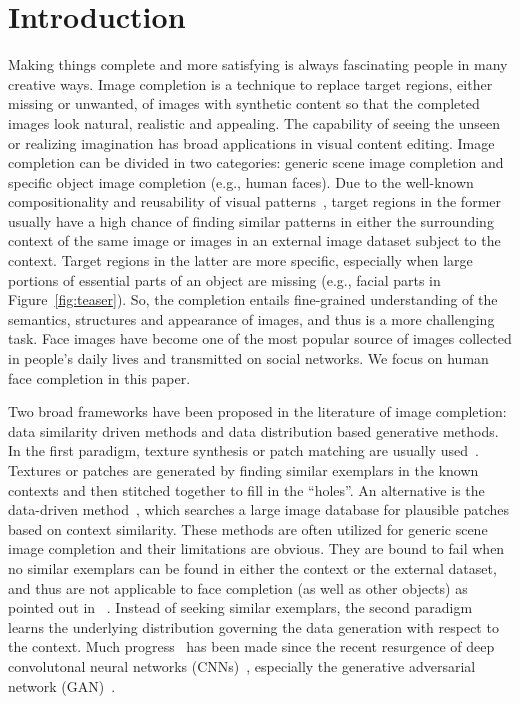 \documentclass[acmtog,timestamp]{acmart}
\begin{document}

\section{Introduction}
Making things complete and more satisfying is always fascinating people in many creative ways. Image completion is a technique to replace target regions, either missing or unwanted, of images with synthetic content so that the completed images look natural, realistic and  appealing. The capability of seeing the unseen or realizing imagination has broad applications in visual content editing. 
Image completion can be divided in two categories: generic scene image completion and specific object image completion (e.g., human faces). Due to the well-known compositionality and reusability of visual patterns~\cite{geman2002composition}, target regions in the former usually have a high chance of finding similar patterns in either the surrounding context of the same image or images in an external image dataset subject to the context. Target regions in the latter are more specific, especially when large portions of essential
parts of an object are missing (e.g., facial parts in Figure~\ref{fig:teaser}). So, the completion entails  fine-grained understanding of the semantics, structures and appearance of images, and thus is a more challenging task. Face images have become one of the most popular source of images collected in people's daily lives and transmitted on social networks. We focus on human face completion in this paper.  

Two broad frameworks have been proposed in the literature of image completion: data similarity driven methods and data distribution based generative methods. In the first paradigm, texture synthesis or patch matching are usually used~\cite{efros1999texture,kwatra2003graphcut,criminisi2003object,wilczkowiak2005hole,komodakis2006image,barnes2009patchmatch,darabi2012image,huang2014image,wexler2007space}. Textures or patches are generated by finding similar exemplars in the known contexts and then stitched together to fill in the ``holes''. An alternative is the data-driven method~\cite{hays2007scene}, which searches a large image database for plausible patches based on context similarity. These methods are often utilized for generic scene image completion and their limitations are obvious. They are bound to fail when no similar exemplars can be found in either the context or the external dataset, and thus are not applicable to face completion (as well as other objects) as pointed out in ~\cite{iizuka2017globally,yeh2017semantic}. Instead of seeking similar exemplars, the second paradigm learns the underlying distribution governing the data generation with respect to the context. Much progress~\cite{li2017generative,yeh2017semantic,yang2016high,iizuka2017globally,denton2016semi,pathak2016context} has been made since the recent resurgence of deep convolutonal neural networks (CNNs)~\cite{cnn,AlexNet}, especially the generative adversarial network (GAN)~\cite{goodfellow2014generative}. 
\end{document}
